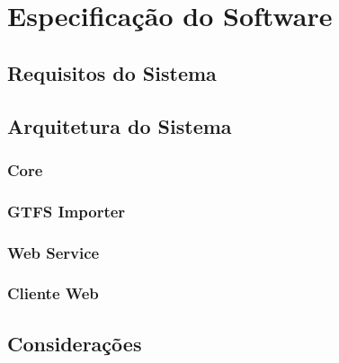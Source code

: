 
\chapter{Especificação do Software}

\section{Requisitos do Sistema}

\section{Arquitetura do Sistema}

\subsection{Core}

\subsection{GTFS Importer}

\subsection{Web Service}

\subsection{Cliente Web}

\section{Considerações}

